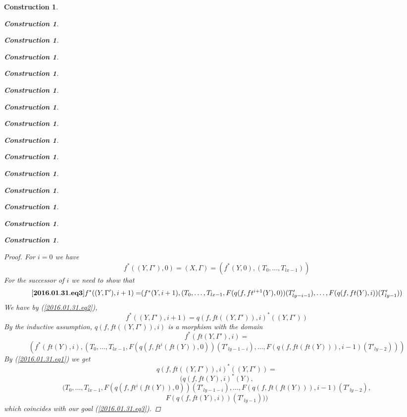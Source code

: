 \documentclass[12pt]{amsart}
\newenvironment{eq}{\begin{equation}}{\end{equation}}
\newtheorem{lemma}[proposition]{Lemma}
\newtheorem{construction}[proposition]{Construction}
\newcommand{\llabel}[1]{\label{#1}[{\bf #1}]}
\renewcommand{\comment}[1]{}
\newcommand{\sr}{\rightarrow}
\begin{document}
\begin{construction}
\begin{construction}
\begin{construction}
\begin{construction}
\begin{construction}
\begin{construction}
\begin{construction}
\begin{construction}
\begin{construction}
\begin{construction}
\begin{construction}
\begin{construction}
\begin{construction}
\begin{construction}
\begin{construction}
\begin{proof}
For $i=0$ we have 
%
$$f^*((Y,\Gamma'),0)=(X,\Gamma)=(f^*(Y,0),(T_0,\dots,T_{lx-1}))$$
%
For the successor of $i$ we need to show that
%
\begin{eq}\llabel{2016.01.31.eq3}
f^*((Y,\Gamma'),i+1)=$$$$(f^*(Y,i+1),(T_0,\dots,T_{lx-1},F(q(f,ft^{i+1}(Y),0))(T'_{ly-i-1}),\dots,F(q(f,ft(Y),i))(T'_{ly-1}))
\end{eq}
%
We have by (\ref{2016.01.31.eq2}),  
%
$$f^*((Y,\Gamma'),i+1)=q(f,ft((Y,\Gamma')),i)^*((Y,\Gamma'))$$
%
By the inductive assumption, $q(f,ft((Y,\Gamma')),i)$ is a morphism with the domain
%
$$f^*(ft(Y,\Gamma'),i)=$$$$(f^*(ft(Y),i),(T_0,\dots,T_{lx-1},F(q(f,ft^{i}(ft(Y)),0))(T'_{ly-1-i}),\dots,F(q(f,ft(ft(Y))),i-1)(T'_{ly-2})))$$
%
By (\ref{2016.01.31.eq1}) we get
%
$$q(f,ft((Y,\Gamma')),i)^*((Y,\Gamma'))=$$
$$(q(f,ft(Y),i)^*(Y),$$
$$(T_0,\dots,T_{lx-1},F(q(f,ft^{i}(ft(Y)),0))(T'_{ly-1-i}),\dots,F(q(f,ft(ft(Y))),i-1)(T'_{ly-2}), $$$$F(q(f,ft(Y),i))(T'_{ly-1})))$$
%
which coincides with our goal (\ref{2016.01.31.eq3}). 
\end{proof}
%


\comment{
\begin{lemma}
\llabel{2015.08.26.l7}
Let $(Y,\Gamma')\ge (W,\Delta)$ where $\Gamma'=(T'_0,\dots,T'_{l(Y)-1})$ and let $f:(X,\Gamma)\sr (W,\Delta)$ be a morphism where $\Gamma=(T_0,\dots,T_{l(X)-1})$. Then one has
%
$$f^*((Y,\Gamma'))=(f^*(Y),(T_0,\dots,T_{l(X)-1},F(q(f,ft^{n'-n}(Y)))(T'_n),\dots,F(q(f,Y))(T'_{n'-1})))$$
%
\end{lemma}
%
\begin{proof}
Let $n=l(W)$ and let $i=n'-n$. Then $(W,\Delta)=ft^i((Y,\Gamma'))$, i.e., $W=ft^i(Y)$, $\Delta=(T'_0,\dots,T'_{n-1})$ and $\Gamma'=(T'_0,\dots,T'_{n-1+i})$. By definition $f^*((Y,\Gamma'))=f^*((Y,\Gamma'),i)$. 

The proof is by induction on $i$ after replacing $n'$ with $n+i$. 

For $i=0$ we have $f^*((Y,\Gamma'),0)=(X,\Gamma)$.


\end{proof}}
\end{construction}
\end{construction}
\end{construction}
\end{construction}
\end{construction}
\end{construction}
\end{construction}
\end{construction}
\end{construction}
\end{construction}
\end{construction}
\end{construction}
\end{construction}
\end{construction}
\end{construction}
\end{document}
